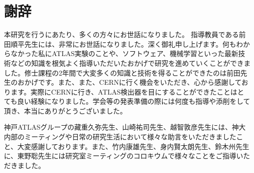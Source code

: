 \chapter*{謝辞}

本研究を行うにあたり、多くの方々にお世話になりました。
指導教員である前田順平先生には、非常にお世話になりました。深く御礼申し上げます。何もわからなかった私にATLAS実験のことや、ソフトウェア、機械学習といった最新技術などの知識を根気よく指導いただいたおかげで研究を進めていくことができました。修士課程の2年間で大変多くの知識と技術を得ることができたのは前田先生のおかげです。また、また、CERNに行く機会をいただき、心から感謝しております。実際にCERNに行き、ATLAS検出器を目にすることができたことはとても良い経験になりました。学会等の発表準備の際には何度も指導や添削をして頂き、本当にありがとうございました。

神戸ATLASグループの藏重久弥先生、山崎祐司先生、越智敦彦先生には、神大内部のミーティングや日常の研究生活において様々な助言をいただきましたこと、大変感謝しております。また、竹内康雄先生、身内賢太朗先生、鈴木州先生に、東野聡先生には研究室ミーティングのコロキウムで様々なことをご指導いただきました。




